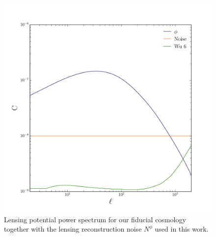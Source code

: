 \documentclass[aps,prd,preprint,groupedaddress]{revtex4-1}
\begin{document}
\begin{figure}[htbp]
\begin{center}
\includegraphics[scale=0.6]{PS_phi_with_noise.pdf}
\caption{Lensing potential power spectrum for our fiducial cosmology together with the lensing reconstruction noise $N^{\phi}$ used in this work.}
\label{fig:phi-cl-noise}
\end{center}
\end{figure}
\end{document}

